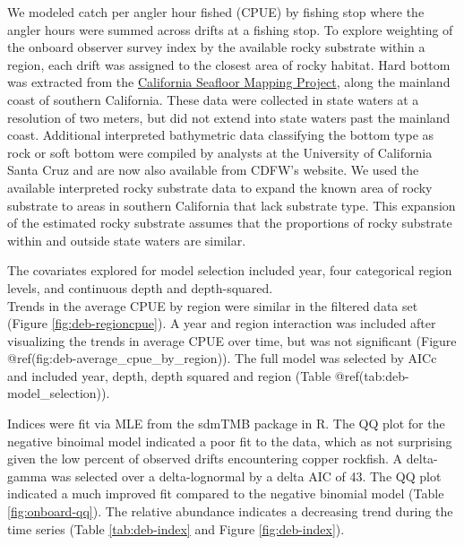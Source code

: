 \documentclass[11pt,
  english,
  letterpaper,
]{article}
\begin{document}
We modeled catch per angler hour fished (CPUE) by fishing stop where the angler hours were summed across drifts at a fishing stop. To explore weighting of the onboard observer survey index by the available rocky substrate within a region, each drift was assigned to the closest area of rocky habitat. Hard bottom was extracted from the \href{http://seafloor.otterlabs.org/index.html}{California Seafloor Mapping Project}, along the mainland coast of southern California. These data were collected in state waters at a resolution of two meters, but did not extend into state waters past the mainland coast. Additional interpreted bathymetric data classifying the bottom type as rock or soft bottom were compiled by analysts at the University of California Santa Cruz and are now also available from CDFW's website. We used the available interpreted rocky substrate data to expand the known area of rocky substrate to areas in southern California that lack substrate type. This expansion of the estimated rocky substrate assumes that the proportions of rocky substrate within and outside state waters are similar.

The covariates explored for model selection included year, four categorical region levels, and continuous depth and depth-squared.\\
Trends in the average CPUE by region were similar in the filtered data set (Figure \ref{fig:deb-regioncpue}). A year and region interaction was included after visualizing the trends in average CPUE over time, but was not significant (Figure @ref(fig:deb-average\_cpue\_by\_region)). The full model was selected by AICc and included year, depth, depth squared and region (Table @ref(tab:deb-model\_selection)).

Indices were fit via MLE from the sdmTMB package in R. The QQ plot for the negative binoimal model indicated a poor fit to the data, which as not surprising given the low percent of observed drifts encountering copper rockfish. A delta-gamma was selected over a delta-lognormal by a delta AIC of 43. The QQ plot indicated a much improved fit compared to the negative binomial model (Table \ref{fig:onboard-qq}). The relative abundance indicates a decreasing trend during the time series (Table \ref{tab:deb-index} and Figure \ref{fig:deb-index}).

\begingroup\fontsize{10}{12}\selectfont
\begingroup\fontsize{10}{12}\selectfont
\end{document}

